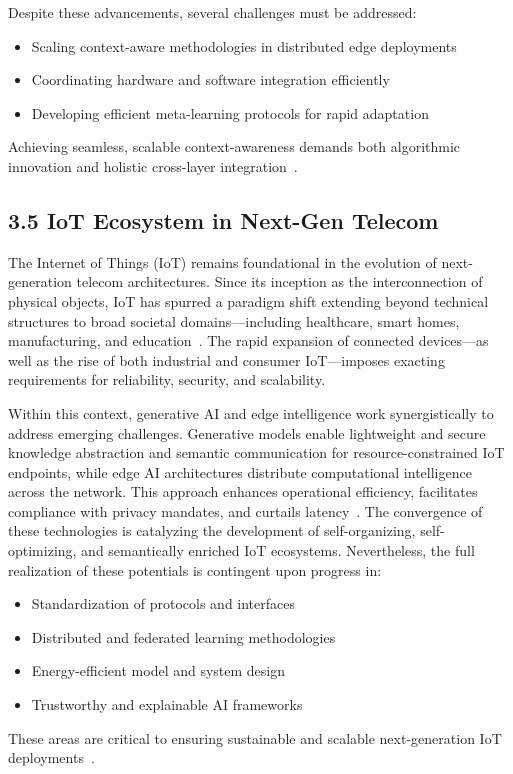 \documentclass[11pt]{article}
\begin{document}
Despite these advancements, several challenges must be addressed:
\begin{itemize}
    \item Scaling context-aware methodologies in distributed edge deployments
    \item Coordinating hardware and software integration efficiently
    \item Developing efficient meta-learning protocols for rapid adaptation
\end{itemize}
Achieving seamless, scalable context-awareness demands both algorithmic innovation and holistic cross-layer integration~\cite{ref27, ref28, ref39}.

\subsection{3.5 IoT Ecosystem in Next-Gen Telecom}

The Internet of Things (IoT) remains foundational in the evolution of next-generation telecom architectures. Since its inception as the interconnection of physical objects, IoT has spurred a paradigm shift extending beyond technical structures to broad societal domains—including healthcare, smart homes, manufacturing, and education~\cite{ref45}. The rapid expansion of connected devices—as well as the rise of both industrial and consumer IoT—imposes exacting requirements for reliability, security, and scalability.

Within this context, generative AI and edge intelligence work synergistically to address emerging challenges. Generative models enable lightweight and secure knowledge abstraction and semantic communication for resource-constrained IoT endpoints, while edge AI architectures distribute computational intelligence across the network. This approach enhances operational efficiency, facilitates compliance with privacy mandates, and curtails latency~\cite{ref44, ref45, ref49}. The convergence of these technologies is catalyzing the development of self-organizing, self-optimizing, and semantically enriched IoT ecosystems. Nevertheless, the full realization of these potentials is contingent upon progress in:
\begin{itemize}
    \item Standardization of protocols and interfaces
    \item Distributed and federated learning methodologies
    \item Energy-efficient model and system design
    \item Trustworthy and explainable AI frameworks
\end{itemize}
These areas are critical to ensuring sustainable and scalable next-generation IoT deployments~\cite{ref44, ref45}.
\end{document}
